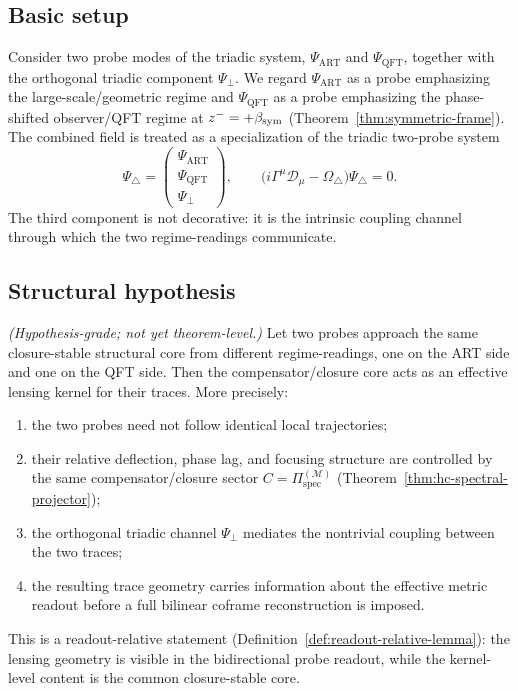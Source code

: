 \subsection*{Basic setup}

Consider two probe modes of the triadic system,
$\Psi_{\mathrm{ART}}$ and $\Psi_{\mathrm{QFT}}$,
together with the orthogonal triadic component $\Psi_\perp$.
We regard $\Psi_{\mathrm{ART}}$ as a probe emphasizing the
large-scale/geometric regime and $\Psi_{\mathrm{QFT}}$ as a probe
emphasizing the phase-shifted observer/QFT regime at
$z^- = +\beta_{\mathrm{sym}}$ (Theorem~\ref{thm:symmetric-frame}).
The combined field is treated as a specialization of the triadic
two-probe system
\[
  \Psi_{\triangle}
  =
  \begin{pmatrix}
    \Psi_{\mathrm{ART}}\\
    \Psi_{\mathrm{QFT}}\\
    \Psi_\perp
  \end{pmatrix},
  \qquad
  \bigl(i\Gamma^\mu\mathcal{D}_\mu - \Omega_\triangle\bigr)
  \Psi_\triangle = 0.
\]
The third component is not decorative: it is the intrinsic coupling
channel through which the two regime-readings communicate.

\subsection*{Structural hypothesis}

\begin{proposition}
\label{hyp:bidirectional-probe-lensing}
\emph{(Hypothesis-grade; not yet theorem-level.)}
Let two probes approach the same closure-stable structural core from
different regime-readings, one on the ART side and one on the QFT side.
Then the compensator/closure core acts as an effective lensing kernel
for their traces. More precisely:
\begin{enumerate}[label=(\roman*)]
  \item the two probes need not follow identical local trajectories;
  \item their relative deflection, phase lag, and focusing structure are
        controlled by the same compensator/closure sector
        $C = \Pi^{(\mathcal{M})}_{\mathrm{spec}}$
        (Theorem~\ref{thm:hc-spectral-projector});
  \item the orthogonal triadic channel $\Psi_\perp$ mediates the
        nontrivial coupling between the two traces;
  \item the resulting trace geometry carries information about the
        effective metric readout before a full bilinear coframe
        reconstruction is imposed.
\end{enumerate}
This is a readout-relative statement
(Definition~\ref{def:readout-relative-lemma}): the lensing geometry is
visible in the bidirectional probe readout, while the kernel-level
content is the common closure-stable core.
\end{proposition}

